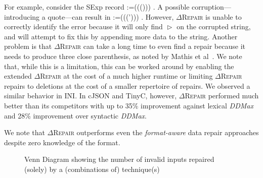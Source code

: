 \documentclass[acmsmall,screen,review,anonymous]{acmart}
\makeatletter
\newcommand{\dtask}{data repair\xspace}
\def\Rincomplete{\texttt{\color{incompletecolor}\textbf{$\vartriangleright$}}\xspace}
\newcommand{\approach}{\textsc{$\Delta$Repair}\xspace}
\newcommand{\ddmax}{\textit{DDMax}\xspace}
\newcommand{\ddmaxg}{\textit{DDmaxG}\xspace}
\newcommand{\drepair}{\approach}
\newcommand\letterboxed[1]{%
\setlength{\fboxsep}{0pt}%
  \@tfor\@ii:=#1\do{%
    \fcolorbox{light-gray}{white}%
    {\texttt{\strut\@ii}}%
  }%
}
\makeatother
\begin{document}
For example, consider the SExp record \letterboxed{((()))}.
A possible corruption---introducing a quote---can result in \letterboxed{(((')))}.
However, \drepair is unable to correctly identify the error because it will
only find \Rincomplete on the corrupted string, and will attempt to fix this
by appending more data to the string. Another problem is that \drepair can take
a long time to even find a repair because it needs to produce three close
parenthesis, as noted by Mathis et al~\cite{mathis2019parser}.
We note that, while this is a limitation, this can be worked around by
enabling the extended \drepair at the cost of a much higher runtime or
limiting \drepair repairs to deletions at the cost of a smaller repertoire
of repairs. We observed a similar behavior in INI. In cJSON and TinyC, however,
\drepair performed much better than its competitors with up to 35\% improvement
against lexical \ddmax and 28\% improvement over syntactic \ddmax.

We note that \drepair outperforms even the \emph{format-aware} \dtask approaches
despite zero knowledge of the format.

\begin{figure}[!tbp]
\centering
\caption{\centering
Venn Diagram showing the number of invalid inputs repaired (solely) by a (combinations of) technique(s) %
}
\begin{minipage}[b]{0.45\textwidth}
    \centering
\end{minipage}
\label{fig:repaircomplementarity}
\end{figure}
\end{document}
